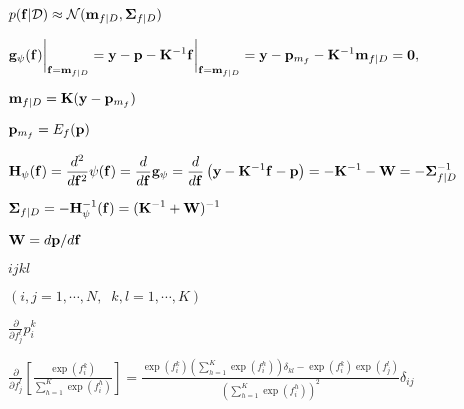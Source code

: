 \documentclass{article}
\def\lthtmlcheckvsize{\ifdim\ht\sizebox<\vsize 
  \ifdim\wd\sizebox<\hsize\expandafter\hfill\fi \expandafter\vfill
  \else\expandafter\vss\fi}%
\begin{document}
{\newpage\clearpage
{}%
$ p({\bf f}|{\cal D})\approx{\cal N}({\bf m}_{f|D},{\bf\Sigma}_{f|D})$%
\lthtmlindisplaymathZ
\lthtmlcheckvsize\clearpage}

{\newpage\clearpage
{}%
$\displaystyle {\bf g}_\psi({\bf f})\bigg|_{{\bf f}={\bf m}_{f|D}}
={\bf y}-{\bf p}-{\bf K}^{-1}{\bf f}\bigg|_{{\bf f}={\bf m}_{f|D}}
={\bf y}-{\bf p}_{m_f}-{\bf K}^{-1}{\bf m}_{f|D}={\bf0},$%
\lthtmlindisplaymathZ
\lthtmlcheckvsize\clearpage}

{\newpage\clearpage
{}%
$\displaystyle {\bf m}_{f|D}={\bf K}({\bf y}-{\bf p}_{m_f})$%
\lthtmlindisplaymathZ
\lthtmlcheckvsize\clearpage}

{\newpage\clearpage
{}%
$ {\bf p}_{m_f}=E_f({\bf p})$%
\lthtmlindisplaymathZ
\lthtmlcheckvsize\clearpage}

{\newpage\clearpage
{}%
$\displaystyle {\bf H}_\psi({\bf f})=\frac{d^2}{d{\bf f}^2} \psi({\bf f})
=\frac{d}{d{\bf f}} {\bf g}_\psi
=\frac{d}{d{\bf f}}\left( {\bf y}-{\bf K}^{-1}{\bf f}-{\bf p} \right)
=-{\bf K}^{-1} -{\bf W}=-{\bf\Sigma}_{f|D}^{-1}$%
\lthtmlindisplaymathZ
\lthtmlcheckvsize\clearpage}

{\newpage\clearpage
{}%
$\displaystyle {\bf\Sigma}_{f|D}=-{\bf H}^{-1}_\psi({\bf f})=({\bf K}^{-1}+{\bf W})^{-1}$%
\lthtmlindisplaymathZ
\lthtmlcheckvsize\clearpage}

{\newpage\clearpage
{}%
$ {\bf W}=d{\bf p}/d{\bf f}$%
\lthtmlindisplaymathZ
\lthtmlcheckvsize\clearpage}

{\newpage\clearpage
{}%
$ ijkl$%
\lthtmlindisplaymathZ
\lthtmlcheckvsize\clearpage}

{\newpage\clearpage
{}%
$ (i,j=1,\cdots,N,\;\;k,l=1,\cdots,K)$%
\lthtmlindisplaymathZ
\lthtmlcheckvsize\clearpage}

{\newpage\clearpage
{}%
$\displaystyle \frac{\partial}{\partial f_j^l} p_i^k$%
\lthtmlindisplaymathZ
\lthtmlcheckvsize\clearpage}

{\newpage\clearpage
{}%
$\displaystyle \frac{\partial}{\partial f_j^l}\left[\frac{\exp(f_i^k)}{\sum_{h=1}^K\exp(f_i^h)}\right]
=\frac{\exp(f_i^k)\left(\sum_{h=1}^K\exp(f_i^h)\right)\delta_{kl}
-\exp(f_i^k)\exp(f_j^l)}{\left(\sum_{h=1}^K\exp(f_i^h)\right)^2}\delta_{ij}$%
\lthtmlindisplaymathZ
\lthtmlcheckvsize\clearpage}
\end{document}
